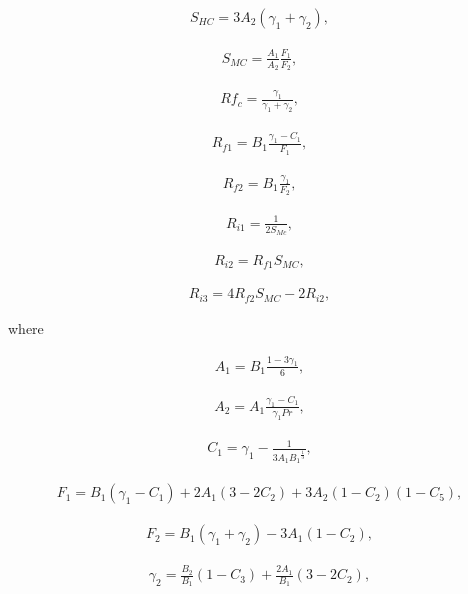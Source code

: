 \begin{eqnarray}S_{HC}=3A_2(\gamma_1+\gamma_2),\end{eqnarray}

\begin{eqnarray}S_{MC}=\frac{A_1}{A_2}\frac{F_1}{F_2},\end{eqnarray}

\begin{eqnarray}Rf_c=\frac{\gamma_1}{\gamma_1+\gamma_2},\end{eqnarray}

\begin{eqnarray}R_{f1}=B_1\frac{\gamma_1-C_1}{F_1},\end{eqnarray}

\begin{eqnarray}R_{f2}=B_1\frac{\gamma_1}{F_2},\end{eqnarray}

\begin{eqnarray}R_{i1}=\frac{1}{2S_{Mc}},\end{eqnarray}

\begin{eqnarray}R_{i2}=R_{f1}S_{MC},\end{eqnarray}

\begin{eqnarray}R_{i3}=4R_{f2}S_{MC}-2R_{i2},\end{eqnarray}

where

\begin{eqnarray}A_1=B_1\frac{1-3\gamma_1}{6},\end{eqnarray}

\begin{eqnarray}A_2=A_1\frac{\gamma_1-C_1}{\gamma_1 Pr},\end{eqnarray}

\begin{eqnarray}C_1=\gamma_1-\frac{1}{3A_1{B_1}^{\frac{1}{3}}},\end{eqnarray}

\begin{eqnarray}F_1=B_1(\gamma_1-C_1)+2A_1(3-2C_2)+3A_2(1-C_2)(1-C_5),\end{eqnarray}

\begin{eqnarray}F_2=B_1(\gamma_1+\gamma_2)-3A_1(1-C_2),\end{eqnarray}

\begin{eqnarray}\gamma_2=\frac{B_2}{B_1}\left(1-C_3\right)+\frac{2A_1}{B_1}\left(3-2C_2\right),\end{eqnarray}

